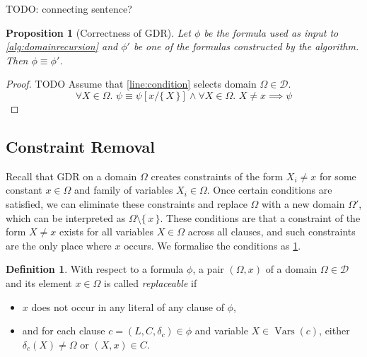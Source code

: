 \documentclass{article}
\newtheorem{proposition}{Proposition}
\theoremstyle{definition}
\newtheorem{definition}{Definition}
\DeclareMathOperator{\Vars}{Vars}
\begin{document}
TODO: connecting sentence?

\begin{proposition}[Correctness of GDR]
  Let $\phi$ be the formula used as input to \cref{alg:domainrecursion} and
  $\phi'$ be one of the formulas constructed by the algorithm. Then
  $\phi \equiv \phi'$.
\end{proposition}
\begin{proof}
  TODO
  Assume that \cref{line:condition} selects domain $\Omega \in \mathcal{D}$.
  \[
    \forall X \in \Omega\text{. } \psi \equiv \psi[x/\{\, X \,\}] \land \forall X \in \Omega\text{. } X \ne x \implies \psi
  \]
\end{proof}

\subsection{Constraint Removal}\label{sec:cr}

Recall that GDR on a domain $\Omega$ creates constraints of the form $X_i \ne x$
for some constant $x \in \Omega$ and family of variables $X_i \in \Omega$. Once
certain conditions are satisfied, we can eliminate these constraints and replace
$\Omega$ with a new domain $\Omega'$, which can be interpreted as
$\Omega \setminus \{\, x \,\}$. These conditions are that a constraint of the
form $X \ne x$ exists for all variables $X \in \Omega$ across all clauses, and
such constraints are the only place where $x$ occurs. We formalise the
conditions as \cref{def:replaceable}.

\begin{definition}\label{def:replaceable}
  With respect to a formula $\phi$, a pair $(\Omega, x)$ of a domain
  $\Omega \in \mathcal{D}$ and its element $x \in \Omega$ is called
  \emph{replaceable} if
  \begin{itemize}
    \item $x$ does not occur in any literal of any clause of $\phi$,
    \item and for each clause $c = (L, C, \delta_c) \in \phi$ and variable
          $X \in \Vars(c)$, either $\delta_c(X) \ne \Omega$ or $(X, x) \in C$.
  \end{itemize}
\end{definition}
\end{document}
